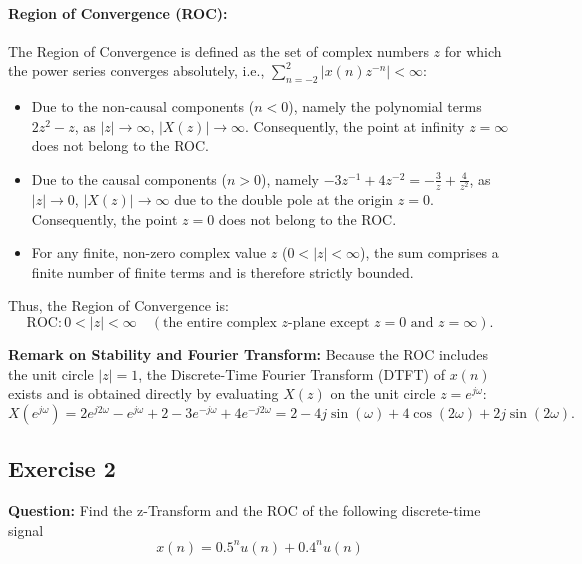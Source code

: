 \documentclass[12pt,a4paper]{article}
\begin{document}
\paragraph{Region of Convergence (ROC):}
The Region of Convergence is defined as the set of complex numbers $z$ for which the power series converges absolutely, i.e., $\sum_{n=-2}^{2} |x(n) z^{-n}| < \infty$:
\begin{itemize}
    \item Due to the non-causal components ($n < 0$), namely the polynomial terms $2z^2 - z$, as $|z| \to \infty$, $|X(z)| \to \infty$. Consequently, the point at infinity $z = \infty$ does not belong to the ROC.
    \item Due to the causal components ($n > 0$), namely $-3z^{-1} + 4z^{-2} = -\frac{3}{z} + \frac{4}{z^2}$, as $|z| \to 0$, $|X(z)| \to \infty$ due to the double pole at the origin $z = 0$. Consequently, the point $z = 0$ does not belong to the ROC.
    \item For any finite, non-zero complex value $z$ ($0 < |z| < \infty$), the sum comprises a finite number of finite terms and is therefore strictly bounded.
\end{itemize}
Thus, the Region of Convergence is:
\begin{equation}
    \text{ROC}: 0 < |z| < \infty \quad (\text{the entire complex $z$-plane except } z = 0 \text{ and } z = \infty).
    \label{eq:ex1_roc}
\end{equation}

\noindent\textbf{Remark on Stability and Fourier Transform:}
Because the ROC includes the unit circle $|z| = 1$, the Discrete-Time Fourier Transform (DTFT) of $x(n)$ exists and is obtained directly by evaluating $X(z)$ on the unit circle $z = e^{j\omega}$:
\[
X(e^{j\omega}) = 2e^{j2\omega} - e^{j\omega} + 2 - 3e^{-j\omega} + 4e^{-j2\omega} = 2 - 4j\sin(\omega) + 4\cos(2\omega) + 2j\sin(2\omega).
\]

\subsection{Exercise 2}\label{sec:ex2}
\noindent\textbf{Question:} Find the z-Transform and the ROC of the following discrete-time signal
\[x(n)=0.5^n u(n)+0.4^n u(n)\]
\end{document}

